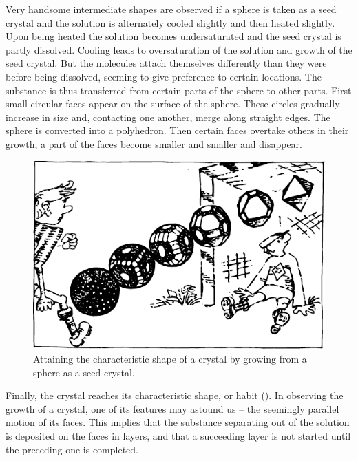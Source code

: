 Very handsome intermediate shapes are observed if a sphere is taken as a seed crystal and the solution is alternately cooled slightly and then heated slightly. Upon being heated the solution becomes undersaturated and the seed crystal is partly dissolved. Cooling leads to oversaturation of the solution and growth of the seed crystal. But the molecules attach themselves differently than they were before being dissolved, seeming to give preference to certain locations. The substance is thus transferred from certain parts of the sphere to other parts. First small circular faces appear on the surface of the sphere. These circles gradually increase in size and, contacting one another, merge along straight edges. The sphere is converted into a polyhedron. Then certain faces overtake others in their growth, a part of the faces become smaller and smaller and disappear. 
\begin{figure}[!ht]
\centering
\includegraphics[width=\textwidth]{figures/fig-04-07.pdf}
\caption{Attaining the characteristic shape of a crystal by growing from a sphere as a seed crystal.}
\label{fig-4.7}
\end{figure}
Finally, the crystal reaches its characteristic shape, or habit (). In observing the growth of a crystal, one of its features may astound us -- the seemingly parallel motion of its faces. This implies that the substance separating out of the solution is deposited on the faces in layers, and that a succeeding layer is not started until the preceding one
is completed.

